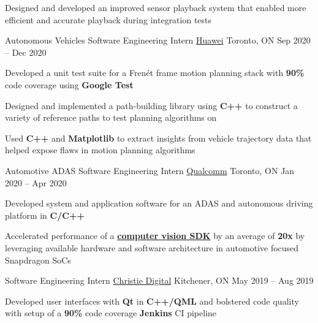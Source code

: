 \documentclass[]{awesome-cv}
\begin{document}
\begin{cventries}
{\begin{cvitems}
	    \item Designed and developed an improved sensor playback system that enabled more efficient and accurate playback during integration tests
	\end{cvitems}}
	\cventry
	{Autonomous Vehicles Software Engineering Intern}
	{\href{https://www.huawei.com/ca/}{Huawei}}
	{Toronto, ON}
	{Sep 2020 – Dec 2020}
	{\begin{cvitems}
		\item {Developed a unit test suite for a Frenét frame motion planning stack with \textbf{90\%} code coverage using \textbf{Google Test}}
		\item {Designed and implemented a path-building library using \textbf{C++} to construct a variety of reference paths to test planning algorithms on}
		\item {Used \textbf{C++} and \textbf{Matplotlib} to extract insights from vehicle trajectory data that helped expose flaws in motion planning algorithms}
	\end{cvitems}}
	\cventry
	{Automotive ADAS Software Engineering Intern}
	{\href{https://www.qualcomm.com/}{Qualcomm}}
	{Toronto, ON}
	{Jan 2020 – Apr 2020}
	{\begin{cvitems}
		\item {Developed system and application software for an ADAS and autonomous driving platform in \textbf{C/C++}}
		\item {Accelerated performance of a \href{https://developer.qualcomm.com/software/fastcv-sdk}{\textbf{computer vision SDK}} by an average of \textbf{20x} by leveraging available hardware and software architecture in automotive focused Snapdragon SoCs}
		\end{cvitems}}
	\cventry
	{Software Engineering Intern}
	{\href{https://www.christiedigital.com/}{Christie Digital}}
	{Kitchener, ON}
	{May 2019 – Aug 2019}
	{\begin{cvitems}
        \item Developed user interfaces with \textbf{Qt} in \textbf{C++/QML} and bolstered code quality with setup of a \textbf{90\%} code coverage \textbf{Jenkins} CI pipeline

\end{cvitems}}
\end{cventries}
\end{document}
